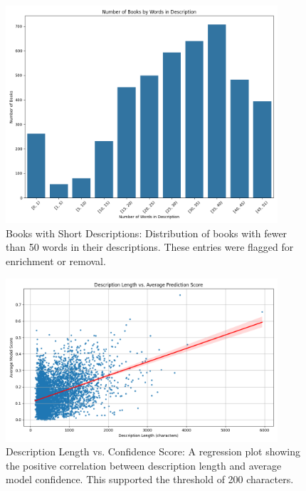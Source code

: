 \begin{figure}[H]
    \centering
    \includegraphics[width=0.9\textwidth]{figures/less_than_50_words_description.png}
    \caption{Books with Short Descriptions: Distribution of books with fewer than 50 words in their descriptions. These entries were flagged for enrichment or removal.}
\end{figure}

\begin{figure}[H]
    \centering
    \includegraphics[width=0.9\textwidth]{figures/category_refined_description_length_vs_avg_score.png}
    \caption{Description Length vs. Confidence Score: A regression plot showing the positive correlation between description length and average model confidence. This supported the threshold of 200 characters.}
\end{figure}

